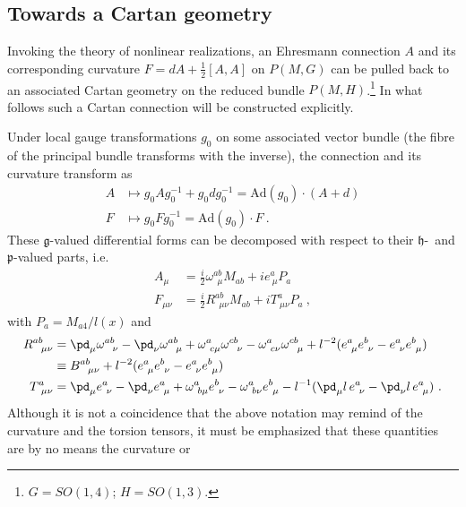 \documentclass[11pt]{article}
\begin{document}
\subsection{Towards a Cartan geometry}

Invoking the theory of nonlinear realizations, an Ehresmann 
connection $A$ and its corresponding curvature $F = dA + 
\tfrac{1}{2}[A,A]$ on $P(M,G)$ can be pulled back to an 
associated Cartan geometry on the reduced bundle 
$P(M,H)$.\footnote{$G = SO(1,4)$; $H = SO(1,3)$.} In what follows
such a Cartan connection will be constructed explicitly.

Under local gauge transformations $g_0$ on some associated vector 
bundle (the fibre of the principal bundle transforms with the 
inverse), the connection and its curvature transform as 
%
\begin{subequations}
\begin{align}
	\label{eq:trafo_conn_dS}
	A &\mapsto g_0 A g_0^{-1} + g_0  dg_0^{-1} = 
	\mathrm{Ad}(g_0)\cdot(A + d)  \\
	\label{eq:trafo_curv_dS}
	F &\mapsto g_0 F g_0^{-1} = \mathrm{Ad}(g_0) \cdot F~.
\end{align}
\end{subequations}
These $\mathfrak{g}$-valued differential forms can be decomposed 
with respect to their $\mathfrak{h}$-~and $\mathfrak{p}$-valued 
parts, i.e.~
%
\begin{align*}
	A_\mu &= \tfrac{i}{2}\omega^{ab}_{~~\mu}M_{ab} + ie^a_{~\mu} 
	P_a \\
	F_{\mu\nu} &= \tfrac{i}{2} R^{ab}_{~~\mu\nu} M_{ab} + 
	iT^a_{~\mu\nu} P_a~,
\end{align*}
with $P_a = M_{a4}/l(x)$ and
%
\begin{align}
	R^{ab}_{~~\mu\nu} &= \pd_\mu \omega^{ab}_{~~\nu} - 
		\pd_\nu \omega^{ab}_{~~\mu} + 
		\omega^a_{~c\mu}\omega^{cb}_{~~\nu} - 
		\omega^a_{~c\nu}\omega^{cb}_{~~\mu} + l^{-2} 
		(e^a_{~\mu}e^b_{~\nu} - e^a_{~\nu}e^b_{~\mu}) \\
		\nonumber
		&\equiv B^{ab}_{~~\mu\nu} + l^{-2} (e^a_{~\mu}e^b_{~\nu} - 
		e^a_{~\nu}e^b_{~\mu}) \\
	T^a_{~\mu\nu} &= \pd_\mu e^a_{~\nu} - \pd_\nu e^a_{~\mu} + 
	\omega^a_{~b\mu} e^b_{~\nu} - \omega^a_{~b\nu} e^b_{~\mu}
	- l^{-1}( \pd_\mu l\, e^a_{~\nu} - \pd_\nu l\, e^a_{~\mu})~.
\end{align}
Although it is not a coincidence that the above notation may 
remind of the curvature and the torsion tensors, it must be 
emphasized that these quantities are by no means the curvature or 
\end{document}

